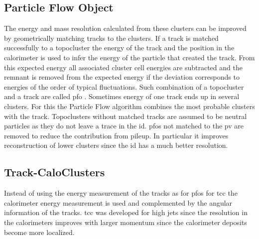 \subsection{Particle Flow Object}
The energy and mass resolution calculated from these clusters can be improved by geometrically matching tracks to the clusters. If a track is matched successfully to a topocluster the energy of the track and the position in the calorimeter is used to infer the energy of the particle that created the track. From this expected energy all associated cluster cell energies are subtracted and the remnant is removed from the expected energy if the deviation corresponds to energies of the order of typical fluctuations. Such combination of a topocluster and a track are called \ac{pfo} \citep{aaboud2017jet}. Sometimes energy of one track ends up in several clusters. For this the Particle Flow algorithm combines the most probable clusters with the track. Topoclusters without matched tracks are assumed to be neutral particles as they do not leave a trace in the \ac{id}. \acp{pfo} not matched to the \ac{pv} are removed to reduce the contribution from pileup. In particular it improves reconstruction of lower \pt clusters since the \ac{id} has a much better resolution.

\subsection{Track-CaloClusters}
Instead of using the energy measurement of the tracks as for \acp{pfo} for \ac{tcc} the calorimeter energy measurement is used and complemented by the angular information of the tracks. \ac{tcc} was developed for high \pt jets since the resolution in the calorimeters improves with larger momentum since the calorimeter deposits become more localized.


